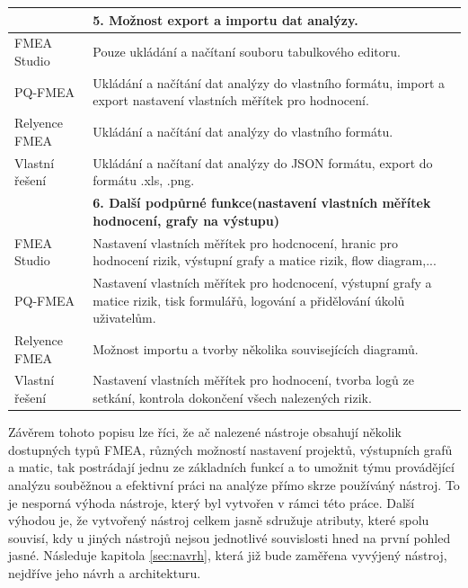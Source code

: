 \begin{longtable}{|p{4cm} | p{12cm} |}
& \textbf{5. Možnost export a importu dat analýzy. } \\ \hline
 FMEA Studio &	Pouze ukládání a načítaní souboru tabulkového editoru.  \\ 
 PQ-FMEA &	  Ukládání a načítání dat analýzy do vlastního formátu, import a export nastavení vlastních měřítek pro hodnocení.   \\ 
 Relyence FMEA &	 Ukládání a načítání dat analýzy do vlastního formátu.  \\ 
Vlastní řešení &	 Ukládání a načítaní dat analýzy do JSON formátu, export do formátu .xls, .png.\\ \hline

& \textbf{6. Další podpůrné funkce(nastavení vlastních měřítek hodnocení, grafy na výstupu)} \\ \hline
 FMEA Studio &	Nastavení vlastních měřítek pro hodcnocení, hranic pro hodnocení rizik, výstupní grafy a matice rizik, flow diagram,...  \\ 
 PQ-FMEA &	 Nastavení vlastních měřítek pro hodcnocení, výstupní grafy a matice rizik, tisk formulářů, logování a přidělování úkolů uživatelům.  \\ 
 Relyence FMEA &	  Možnost importu a tvorby několika souvisejících diagramů. \\ 
Vlastní řešení &	  Nastavení vlastních měřítek pro hodnocení, tvorba logů ze setkání, kontrola dokončení všech nalezených rizik. \\ \hline
\end{longtable}

Závěrem tohoto popisu lze říci, že ač nalezené nástroje obsahují několik dostupných typů FMEA, různých možností nastavení projektů, výstupních grafů a matic, tak postrádají jednu ze základních funkcí a to umožnit týmu provádějící analýzu souběžnou a efektivní práci na analýze přímo skrze používáný nástroj. To je nesporná výhoda nástroje, který byl vytvořen v rámci této práce. Další výhodou je, že vytvořený nástroj celkem jasně sdružuje atributy, které spolu souvisí, kdy u jiných nástrojů nejsou jednotlivé souvislosti hned na první pohled jasné. Následuje kapitola \ref{sec:navrh}, která již bude zaměřena vyvýjený nástroj, nejdříve jeho návrh a architekturu. 
 